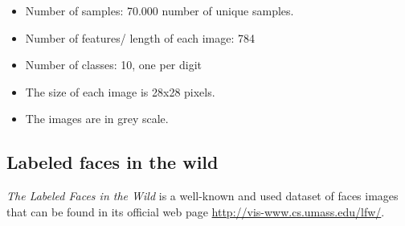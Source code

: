 \begin{itemize}
 \item Number of samples: 70.000 number of unique samples.
 \item Number of features/ length of each image: 784 
 \item Number of classes: 10, one per digit
\item The size of each image is 28x28 pixels.
\item The images are in grey scale.
\end{itemize}

\subsection{Labeled faces in the wild}
\textit{The Labeled Faces in the Wild} is a well-known and used dataset of faces images that can be found in its official web page \url{http://vis-www.cs.umass.edu/lfw/}.\\

